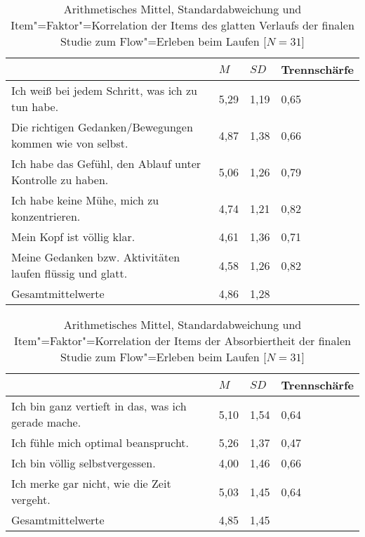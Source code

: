 \begin{table}
	[!htb] \centering \caption[Item"=Faktor"=Korrelation der Items des glatten Verlaufs (Finale Studie: Laufen)]{Arithmetisches Mittel, Standardabweichung und Item"=Faktor"=Korrelation der Items des glatten Verlaufs der finalen Studie zum Flow"=Erleben beim Laufen [$N = 31$]} \label{tab:glatter_verlauf_3} 
	\begin{tabularx}
		{ 
		\textwidth}{p{} p{} p{} p{}} \toprule & $M$ & $SD$ & Trennschärfe \\
		\midrule Ich weiß bei jedem Schritt, was ich zu tun habe. & 5,29 & 1,19 & 0,65 \\
		Die richtigen Gedanken/Bewegungen kommen wie von selbst. & 4,87 & 1,38 & 0,66 \\
		Ich habe das Gefühl, den Ablauf unter Kontrolle zu haben. & 5,06 & 1,26 & 0,79 \\
		Ich habe keine Mühe, mich zu konzentrieren. & 4,74 & 1,21 & 0,82 \\
		Mein Kopf ist völlig klar. & 4,61 & 1,36 & 0,71 \\
		Meine Gedanken bzw. Aktivitäten laufen flüssig und glatt. & 4,58 & 1,26 & 0,82 \\
		Gesamtmittelwerte & 4,86 & 1,28 & \\
		\bottomrule 
	\end{tabularx}
\end{table}
\begin{table}
	[!htb] \centering \caption[Item"=Faktor"=Korrelation der Items der Absorbiertheit (Finale Studie: Laufen)]{Arithmetisches Mittel, Standardabweichung und Item"=Faktor"=Korrelation der Items der Absorbiertheit der finalen Studie zum Flow"=Erleben beim Laufen [$N = 31$]} \label{tab:absorbiertheit_3} 
	\begin{tabularx}
		{ 
		\textwidth}{p{} p{} p{} p{}} \toprule & $M$ & $SD$ & Trennschärfe \\
		\midrule Ich bin ganz vertieft in das, was ich gerade mache. & 5,10 & 1,54 & 0,64 \\
		Ich fühle mich optimal beansprucht. & 5,26 & 1,37 & 0,47 \\
		Ich bin völlig selbstvergessen. & 4,00 & 1,46 & 0,66 \\
		Ich merke gar nicht, wie die Zeit vergeht. & 5,03 & 1,45 & 0,64 \\
		Gesamtmittelwerte & 4,85 & 1,45 & \\
		\bottomrule 
	\end{tabularx}
\end{table}

